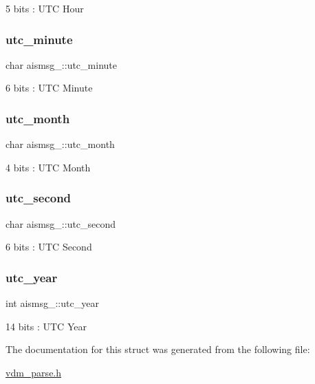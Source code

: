 5 bits \+: U\+TC Hour 

\mbox{\label{structaismsg__4_a6d66f74ac0ce1ea875df08d9defd3ebb}} 
\subsubsection{\texorpdfstring{utc\+\_\+minute}{utc\_minute}}
{\footnotesize\ttfamily char aismsg\+\_\+::utc\+\_\+minute}



6 bits \+: U\+TC Minute 

\mbox{\label{structaismsg__4_adee1c79edb63717101e666877be68e02}} 
\subsubsection{\texorpdfstring{utc\+\_\+month}{utc\_month}}
{\footnotesize\ttfamily char aismsg\+\_\+::utc\+\_\+month}



4 bits \+: U\+TC Month 

\mbox{\label{structaismsg__4_ab89f40bd8f6ab20b0af5c797ffe7d13c}} 
\subsubsection{\texorpdfstring{utc\+\_\+second}{utc\_second}}
{\footnotesize\ttfamily char aismsg\+\_\+::utc\+\_\+second}



6 bits \+: U\+TC Second 

\mbox{\label{structaismsg__4_a9f133fbc7159b755b25a460d7ac4e122}} 
\subsubsection{\texorpdfstring{utc\+\_\+year}{utc\_year}}
{\footnotesize\ttfamily int aismsg\+\_\+::utc\+\_\+year}



14 bits \+: U\+TC Year 



The documentation for this struct was generated from the following file\+:\begin{DoxyCompactItemize}
\item 
\mbox{\hyperlink{vdm__parse_8h}{vdm\+\_\+parse.\+h}}\end{DoxyCompactItemize}
